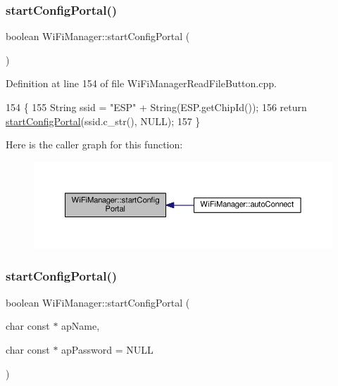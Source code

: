 \mbox{\label{class_wi_fi_manager_ad781751307f7f623956126096a09a545}} 
\subsubsection{\texorpdfstring{start\+Config\+Portal()}{startConfigPortal()}\hspace{0.1cm}{\footnotesize\ttfamily [1/2]}}
{\footnotesize\ttfamily boolean Wi\+Fi\+Manager\+::start\+Config\+Portal (\begin{DoxyParamCaption}{ }\end{DoxyParamCaption})}



Definition at line 154 of file Wi\+Fi\+Manager\+Read\+File\+Button.\+cpp.


\begin{DoxyCode}
154                                        \{
155   String ssid = \textcolor{stringliteral}{"ESP"} + String(ESP.getChipId());
156   \textcolor{keywordflow}{return} \hyperlink{class_wi_fi_manager_ad781751307f7f623956126096a09a545}{startConfigPortal}(ssid.c\_str(), NULL);
157 \}
\end{DoxyCode}
Here is the caller graph for this function\+:\nopagebreak
\begin{figure}[H]
\begin{center}
\leavevmode
\includegraphics[width=350pt]{d4/dc8/class_wi_fi_manager_ad781751307f7f623956126096a09a545_icgraph}
\end{center}
\end{figure}
\mbox{\label{class_wi_fi_manager_afaca5021edffb4d9a5bd39f7b0f7a686}} 
\subsubsection{\texorpdfstring{start\+Config\+Portal()}{startConfigPortal()}\hspace{0.1cm}{\footnotesize\ttfamily [2/2]}}
{\footnotesize\ttfamily boolean Wi\+Fi\+Manager\+::start\+Config\+Portal (\begin{DoxyParamCaption}\item[{char const $\ast$}]{ap\+Name,  }\item[{char const $\ast$}]{ap\+Password = {\ttfamily NULL} }\end{DoxyParamCaption})}



